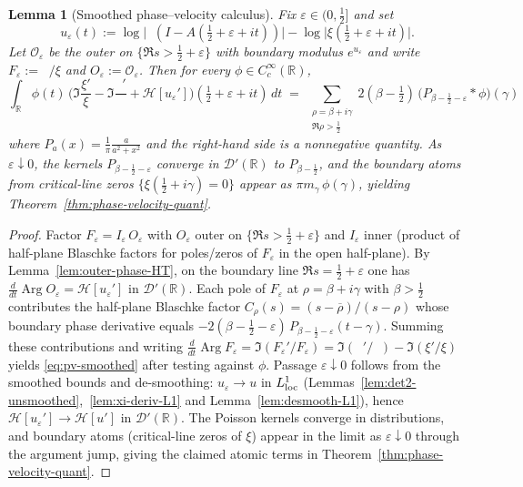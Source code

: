 \documentclass[11pt]{article}
\newcommand{\Hilb}{\mathcal H}
\newtheorem{lemma}[theorem]{Lemma}
\theoremstyle{definition}
\theoremstyle{remark}
\newcommand{\R}{\mathbb{R}}
\DeclareMathOperator{\dettwo}{det_2}
\DeclareMathOperator{\Arg}{Arg}
\begin{document}
\begin{lemma}[Smoothed phase–velocity calculus]\label{lem:pv-test-smoothed}
Fix $\varepsilon\in(0,\tfrac12]$ and set
\[
 u_\varepsilon(t):=\log\Big|\dettwo(I{-}A(\tfrac12{+}\varepsilon{+}it))\Big|-\log\Big|\xi(\tfrac12{+}\varepsilon{+}it)\Big|.
\]
Let $\mathcal O_\varepsilon$ be the outer on $\{\Re s>\tfrac12{+}\varepsilon\}$ with boundary modulus $e^{u_\varepsilon}$ and write $F_\varepsilon:=\dettwo/\xi$ and $O_\varepsilon:=\mathcal O_\varepsilon$. Then for every $\phi\in C_c^\infty(\R)$,
\begin{equation}\label{eq:pv-smoothed}
\int_\R\!\phi(t)\,\Big( \Im\frac{\xi'}{\xi}-\Im\frac{\dettwo'}{\dettwo}+\Hilb[u_\varepsilon']\Big)\!(\tfrac12{+}\varepsilon{+}it)\,dt
\;=\;\sum_{\substack{\rho=\beta+i\gamma\\ \Re\rho>\tfrac12}}\! 2(\beta{-}\tfrac12)\,\big(P_{\beta-\tfrac12-\varepsilon}\!\ast\phi\big)(\gamma)
\end{equation}
where $P_a(x)=\frac{1}{\pi}\frac{a}{a^2+x^2}$ and the right-hand side is a nonnegative quantity. As $\varepsilon\downarrow 0$, the kernels $P_{\beta-\tfrac12-\varepsilon}$ converge in $\mathcal D'(\R)$ to $P_{\beta-\tfrac12}$, and the boundary atoms from critical-line zeros $\{\xi(\tfrac12+i\gamma)=0\}$ appear as $\pi m_\gamma\,\phi(\gamma)$, yielding Theorem~\ref{thm:phase-velocity-quant}.
\end{lemma}
\begin{proof}
Factor $F_\varepsilon=I_\varepsilon\,O_\varepsilon$ with $O_\varepsilon$ outer on $\{\Re s>\tfrac12{+}\varepsilon\}$ and $I_\varepsilon$ inner (product of half-plane Blaschke factors for poles/zeros of $F_\varepsilon$ in the open half-plane). By Lemma~\ref{lem:outer-phase-HT}, on the boundary line $\Re s=\tfrac12{+}\varepsilon$ one has $\frac{d}{dt}\Arg O_\varepsilon=\Hilb[u_\varepsilon']$ in $\mathcal D'(\R)$. Each pole of $F_\varepsilon$ at $\rho=\beta+i\gamma$ with $\beta>\tfrac12$ contributes the half-plane Blaschke factor $C_\rho(s)=(s-\overline\rho)/(s-\rho)$ whose boundary phase derivative equals $-2(\beta-\tfrac12-\varepsilon)\,P_{\beta-\tfrac12-\varepsilon}(t-\gamma)$. Summing these contributions and writing $\frac{d}{dt}\Arg F_\varepsilon=\Im(F_\varepsilon'/F_\varepsilon)=\Im(\dettwo'/\dettwo)-\Im(\xi'/\xi)$ yields \eqref{eq:pv-smoothed} after testing against $\phi$.
Passage $\varepsilon\downarrow 0$ follows from the smoothed bounds and de-smoothing: $u_\varepsilon\to u$ in $L^1_{\rm loc}$ (Lemmas~\ref{lem:det2-unsmoothed},~\ref{lem:xi-deriv-L1} and Lemma~\ref{lem:desmooth-L1}), hence $\Hilb[u_\varepsilon']\to \Hilb[u']$ in $\mathcal D'(\R)$. The Poisson kernels converge in distributions, and boundary atoms (critical-line zeros of $\xi$) appear in the limit as $\varepsilon\downarrow 0$ through the argument jump, giving the claimed atomic terms in Theorem~\ref{thm:phase-velocity-quant}.
\end{proof}
\end{document}
